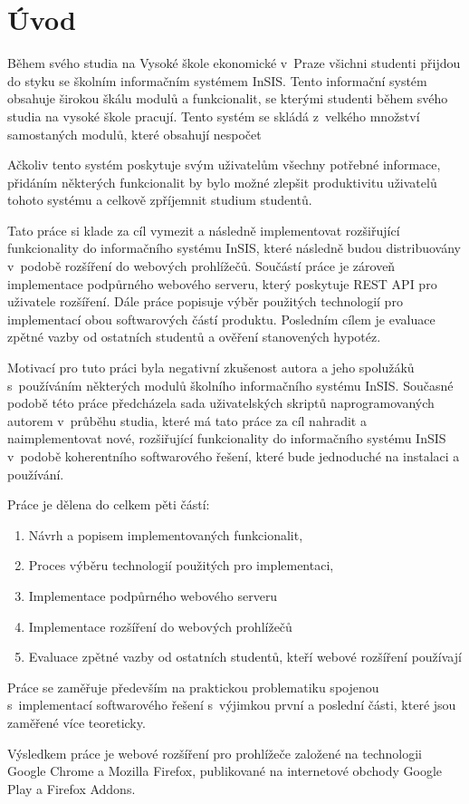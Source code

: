 \chapter*{Úvod}

Během svého studia na Vysoké škole ekonomické v~Praze všichni studenti přijdou do styku se školním informačním systémem InSIS. Tento informační systém obsahuje širokou škálu modulů a funkcionalit, se kterými studenti během svého studia na vysoké škole pracují. Tento systém se skládá z~velkého množství samostaných modulů, které obsahují nespočet 

Ačkoliv tento systém poskytuje svým uživatelům všechny potřebné informace, přidáním některých funkcionalit by bylo možné zlepšit produktivitu uživatelů tohoto systému a celkově zpříjemnit studium studentů.

Tato práce si klade za cíl vymezit a následně implementovat rozšiřující funkcionality do informačního systému InSIS, které následně budou distribuovány v~podobě rozšíření do webových prohlížečů. Součástí práce je zároveň implementace podpůrného webového serveru, který poskytuje REST API pro uživatele rozšíření. Dále práce popisuje výběr použitých technologií pro implementací obou softwarových částí produktu. Posledním cílem je evaluace zpětné vazby od ostatních studentů a ověření stanovených hypotéz.

Motivací pro tuto práci byla negativní zkušenost autora a jeho spolužáků s~používáním některých modulů školního informačního systému InSIS. 
Současné podobě této práce předcházela sada uživatelských skriptů naprogramovaných autorem v~průběhu studia, které má tato práce za cíl nahradit a naimplementovat nové, rozšiřující funkcionality do informačního systému InSIS v~podobě koherentního softwarového řešení, které bude jednoduché na instalaci a používání.

Práce je dělena do celkem pěti částí: 

\begin{enumerate}
    \item Návrh a popisem implementovaných funkcionalit,
    \item Proces výběru technologií použitých pro implementaci,
    \item Implementace podpůrného webového serveru
    \item Implementace rozšíření do webových prohlížečů
    \item Evaluace zpětné vazby od ostatních studentů, kteří webové rozšíření používají
\end{enumerate}

Práce se zaměřuje především na praktickou problematiku spojenou s~implementací softwarového řešení s~výjimkou první a poslední části, které jsou zaměřené více teoreticky.

Výsledkem práce je webové rozšíření pro prohlížeče založené na technologii Google Chrome a Mozilla Firefox, publikované na internetové obchody Google Play a Firefox Addons. 
